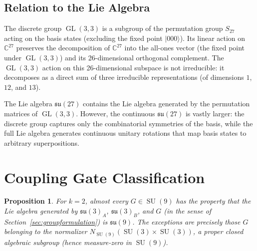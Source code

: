 \documentclass[12pt,a4paper]{article}
\newtheorem{proposition}[theorem]{Proposition}
\newcommand{\GL}{\operatorname{GL}}
\newcommand{\SU}{\operatorname{SU}}
\begin{document}
\subsection{Relation to the Lie Algebra}

The discrete group $\GL(3,3)$ is a subgroup of the permutation group
$S_{27}$ acting on the basis states (excluding the fixed point
$|000\rangle$). Its linear action on $\mathbb{C}^{27}$ preserves the
decomposition of $\mathbb{C}^{27}$ into the all-ones vector (the fixed
point under $\GL(3,3)$) and its 26-dimensional orthogonal complement.
The $\GL(3,3)$ action on this 26-dimensional subspace is not
irreducible: it decomposes as a direct sum of three irreducible
representations (of dimensions $1$, $12$, and $13$).

The Lie algebra $\mathfrak{su}(27)$ contains the Lie algebra generated
by the permutation matrices of $\GL(3,3)$. However, the continuous
$\mathfrak{su}(27)$ is vastly larger: the discrete group captures only
the combinatorial symmetries of the basis, while the full Lie algebra
generates continuous unitary rotations that map basis states to arbitrary
superpositions.

\section{Coupling Gate Classification}

\begin{proposition}
\label{prop:generic}
For $k=2$, almost every $G \in \SU(9)$ has the property that the Lie
algebra generated by $\mathfrak{su}(3)_A$, $\mathfrak{su}(3)_B$, and
$G$ (in the sense of Section~\ref{sec:groupformulation}) is
$\mathfrak{su}(9)$. The exceptions are precisely those $G$ belonging to
the normalizer $N_{\SU(9)}(\SU(3)\times \SU(3))$, a proper closed
algebraic subgroup (hence measure-zero in $\SU(9)$).
\end{proposition}
\end{document}
